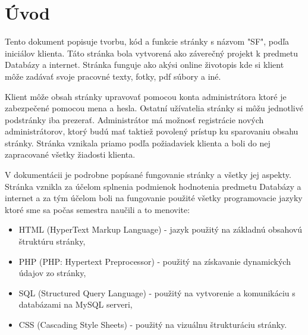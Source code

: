 \chapter*{Úvod}
\label{UVOD}

Tento dokument popisuje tvorbu, kód a funkcie stránky s názvom "SF", podľa iniciálov klienta. Táto stránka bola vytvorená
ako záverečný projekt k predmetu Databázy a internet. Stránka funguje ako akýsi online životopis kde si klient môže zadávať svoje pracovné texty, fotky, pdf súbory a iné.

Klient môže obsah stránky upravovať pomocou konta administrátora ktoré je zabezpečené pomocou mena a hesla. Ostatní užívatelia stránky si môžu jednotlivé podstránky iba prezerať. Administrátor má možnosť registrácie nových administrátorov, ktorý budú mať taktiež povolený prístup ku sparovaniu obsahu stránky. Stránka vznikala priamo podľa požiadaviek klienta a boli do nej zapracované všetky žiadosti klienta.

V dokumentácii je podrobne popísané fungovanie stránky a všetky jej aspekty. Stránka vznikla za účelom splnenia podmienok hodnotenia predmetu Databázy a internet a za tým účelom boli na fungovanie použité všetky programovacie jazyky ktoré sme sa počas semestra naučili a to menovite:

\begin{itemize}
\item HTML (HyperText Markup Language) - jazyk použitý na základnú obsahovú štruktúru stránky,
\item PHP (PHP: Hypertext Preprocessor) - použitý na získavanie dynamických údajov zo stránky,
\item SQL (Structured Query Language) - použitý na vytvorenie a komunikáciu s databázami na MySQL serveri,
\item CSS (Cascading Style Sheets) - použitý na vizuálnu štrukturáciu stránky.
\end{itemize}

